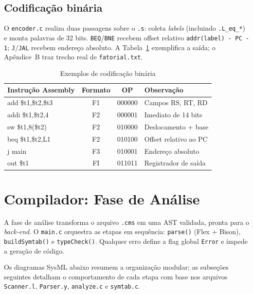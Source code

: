 \documentclass[
	12pt,				%
	openright,			%
	a4paper,			%
	english,			%
	french,				%
	spanish,			%
	brazil,				%
	]{abntex2}
\begin{document}
\section{Codificação binária}

O \texttt{encoder.c} realiza duas passagens sobre o \texttt{.s}: coleta \emph{labels} (incluindo \texttt{.L\_eq\_*}) e monta palavras de 32 bits. \texttt{BEQ}/\texttt{BNE} recebem offset relativo \texttt{addr(label) - PC - 1}; \texttt{J}/\texttt{JAL} recebem endereço absoluto. A Tabela~\ref{tab:codigo-executavel-alvo} exemplifica a saída; o Apêndice~B traz trecho real de \texttt{fatorial.txt}.

\begin{table}[H]
\centering
\caption{Exemplos de codificação binária}
\label{tab:codigo-executavel-alvo}
\small
\begin{tabular}{|p{3.2cm}|c|c|p{4.8cm}|}
\hline
\textbf{Instrução Assembly} & \textbf{Formato} & \textbf{OP} & \textbf{Observação} \\
\hline
add \$t1,\$t2,\$t3 & F1 & 000000 & Campos RS, RT, RD \\
\hline
addi \$t1,\$t2,4 & F2 & 000001 & Imediato de 14 bits \\
\hline
sw \$t1,8(\$t2) & F2 & 010000 & Deslocamento + base \\
\hline
beq \$t1,\$t2,L1 & F2 & 010100 & Offset relativo ao PC \\
\hline
j main & F3 & 010001 & Endereço absoluto \\
\hline
out \$t1 & FI & 011011 & Registrador de saída \\
\hline
\end{tabular}
\end{table}




\chapter{Compilador: Fase de Análise}

A fase de análise transforma o arquivo \texttt{.cms} em uma AST validada, pronta para o \emph{back-end}. O \texttt{main.c} orquestra as etapas em sequência: \texttt{parse()} (Flex + Bison), \texttt{buildSymtab()} e \texttt{typeCheck()}. Qualquer erro define a flag global \texttt{Error} e impede a geração de código.

Os diagramas SysML abaixo resumem a organização modular; as subseções seguintes detalham o comportamento de cada etapa com base nos arquivos \texttt{Scanner.l}, \texttt{Parser.y}, \texttt{analyze.c} e \texttt{symtab.c}.
\end{document}
